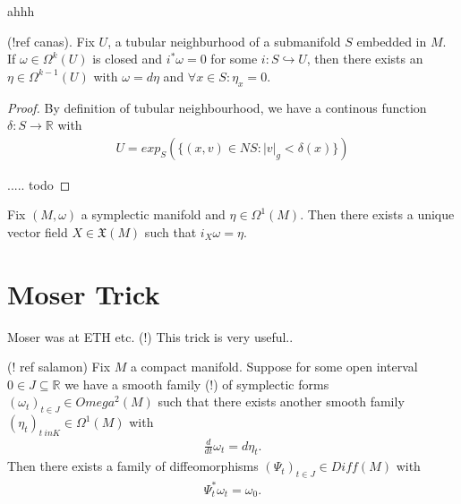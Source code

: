 \begin{theorem} \label{extub}
ahhh
\end{theorem}

\begin{proposition} \label{homoform} (!ref canas).
Fix $U$, a tubular neighburhood of a submanifold $S$ embedded in $M$. If $\omega \in \Omega^k(U)$ is closed and $i^* \omega = 0$ for some $i : S \hookrightarrow U$, then there exists an $\eta \in \Omega^{k-1}(U)$ with $\omega = d\eta$ and $\forall x \in S: \eta_x = 0$.
\end{proposition}

\begin{proof}
By definition of tubular neighbourhood, we have a continous function $\delta : S \to \mathbb{R}$ with 
\begin{align*}
U = exp_S(\{ (x,v) \in NS : |v|_g < \delta(x) \})
\end{align*}

..... todo

\end{proof}

\begin{proposition} \label{propisom}
Fix $(M,\omega)$ a symplectic manifold and $\eta \in \Omega^1(M)$. Then there exists a unique vector field $X \in \mathfrak{X}(M)$ such that $i_X \omega = \eta$.
\end{proposition}

\section{Moser Trick}

\begin{remark}
Moser was at ETH etc. (!)
This trick is very useful..
\end{remark}

\begin{theorem}\label{mostr}
(! ref salamon)
Fix $M$ a compact manifold. Suppose for some open interval $0 \in J \subseteq \mathbb{R}$ we have a smooth family (!) of symplectic forms $(\omega_t)_{t \in J} \in Omega^2(M)$ such that there exists another smooth family $(\eta_t)_{t \ in K} \in \Omega^1(M)$ with
\begin{align*}
\frac{d}{dt} \omega_t = d\eta_t.
\end{align*}
Then there exists a family of diffeomorphisms $(\Psi_t)_{t \in J} \in Diff(M)$ with
\begin{align*}
\Psi^*_t \omega_t = \omega_0.
\end{align*}
\end{theorem}

